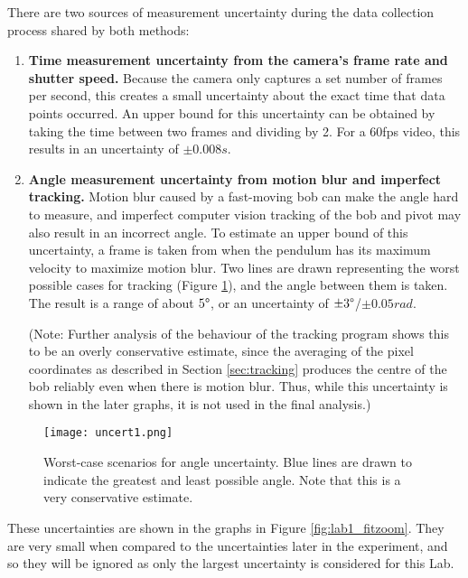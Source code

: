 \documentclass[aps,twocolumn,secnumarabic,nobalancelastpage,amsmath,amssymb,nofootinbib,floatfix,letterpaper]{revtex4}
\begin{document}
There are two sources of measurement uncertainty during the data collection process shared by both methods:
\begin{enumerate}
    \item 
        \textbf{Time measurement uncertainty from the camera's frame rate and shutter speed.} Because the camera only
        captures a set number of frames per second, this creates a small uncertainty about the exact time that data
        points occurred. An upper bound for this uncertainty can be obtained by taking the time between two frames and
        dividing by 2. For a 60fps video, this results in an uncertainty of \(\pm 0.008\si{s}\).
    \item
        \textbf{Angle measurement uncertainty from motion blur and imperfect tracking.} Motion blur caused by a
        fast-moving bob can make the angle hard to measure, and imperfect computer vision tracking of the bob and
        pivot may also result in an incorrect angle. To estimate an upper bound of this uncertainty, a frame is taken
        from when the pendulum has its maximum velocity to maximize motion blur. Two lines are drawn representing the
        worst possible cases for tracking (Figure \ref{fig:angle_uncert}), and the angle between them is taken. The
        result is a range of about \(5\degree\), or an uncertainty of \(\pm 3\degree\)/\(\pm 0.05\si{rad}\).
        
        (Note: Further analysis of the behaviour of the tracking program shows this to be an overly conservative
        estimate, since the averaging of the pixel coordinates as described in Section \ref{sec:tracking} produces the
        centre of the bob reliably even when there is motion blur. Thus, while this uncertainty is shown in the later
        graphs, it is not used in the final analysis.)
\end{enumerate}
\begin{figure}[htb]
    \texttt{[image: uncert1.png]}
    \caption{Worst-case scenarios for angle uncertainty. Blue lines are drawn to indicate the greatest and least
        possible angle. Note that this is a very conservative estimate.}
    \label{fig:angle_uncert}
\end{figure}

These uncertainties are shown in the graphs in Figure \ref{fig:lab1_fitzoom}. They are very small when
compared to the uncertainties later in the experiment, and so they will be ignored as only the largest uncertainty is
considered for this Lab.
\end{document}
